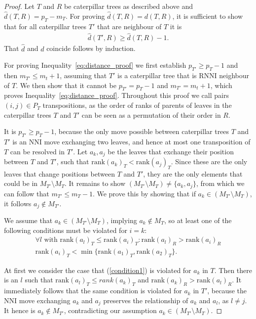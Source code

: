 \documentclass[11pt]{amsart}
\newcommand{\rnni}{\mathrm{RNNI}}
\newcommand{\rank}{\mathrm{rank}}
\newcommand{\nni}{\mathrm{NNI}}
\begin{document}
\begin{proof}
	Let $T$ and $R$ be caterpillar trees as described above and $\hat d(T,R) = p_T - m_T$.
	For proving $\hat d(T,R) = d(T,R)$, it is sufficient to show that for all caterpillar trees $T'$ that are neighbour of $T$ it is
	\begin{align}
		\hat d(T',R) \geq \hat d(T,R) - 1.
		\label{eq:distance_proof}
	\end{align}
	That $\hat d$ and $d$ coincide follows by induction.

	For proving Inequality~\ref{eq:distance_proof} we first establish $p_{T'} \geq p_T - 1$ and then $m_{T'} \leq m_t + 1$, assuming that $T'$ is a caterpillar tree that is $\rnni$ neighbour of $T$.
	We then show that it cannot be $p_{T'} = p_T - 1$ and $m_{T'} = m_t + 1$, which proves Inequality~\ref{eq:distance_proof}.
	Throughout this proof we call pairs $(i,j) \in P_T$ transpositions, as the order of ranks of parents of leaves in the caterpillar trees $T$ and $T'$ can be seen as a permutation of their order in $R$.

	It is $p_{T'} \geq p_T - 1$, because the only move possible between caterpillar trees $T$ and $T'$ is an $\nni$ move exchanging two leaves, and hence at most one transposition of $T$ can be resolved in $T'$.
	Let $a_k, a_j$ be the leaves that exchange their position between $T$ and $T'$, such that $\rank(a_k)_T < \rank(a_j)_T$.
	Since these are the only leaves that change positions between $T$ and $T'$, they are the only elements that could be in $M_{T'} \setminus M_T$.
	It remains to show $(M_{T'} \setminus M_T) \neq \{a_k, a_j\}$, from which we can follow that $m_{T'} \leq m_T - 1$.
	We prove this by showing that if $a_k \in (M_{T'} \setminus M_T)$, it follows $a_j \notin M_{T'}$.

	We assume that $a_k \in (M_{T'} \setminus M_T)$, implying $a_k \notin M_T$, so at least one of the following conditions must be violated for $i = k$:
	\setcounter{equation}{0} %
	\renewcommand{\theequation}{C\arabic{equation}}
	\begin{align}
		\forall l \text{ with } \rank(a_l)_T \leq \rank(a_i)_T: \rank(a_l)_R > \rank(a_i)_R \label{condition1}\\
		\rank(a_i)_T < \min\{\rank(a_1)_T, \rank(a_2)_T\}.
		\label{condition2}
	\end{align}
	\setcounter{equation}{1}
	\renewcommand{\theequation}{\arabic{equation}}

	At first we consider the case that (\ref{condition1}) is violated for $a_k$ in $T$.
	Then there is an $l$ such that $\rank(a_l)_T \leq rank(a_k)_T$ and $\rank(a_k)_R > \rank(a_l)_R$.
	It immediately follows that the same condition is violated for $a_k$ in $T'$, because the $\nni$ move exchanging $a_k$ and $a_j$ preserves the relationship of $a_k$ and $a_l$, as $l \neq j$.
	It hence is $a_k \notin M_{T'}$, contradicting our assumption $a_k \in (M_{T'} \setminus M_T)$.


\end{proof}
\end{document}

